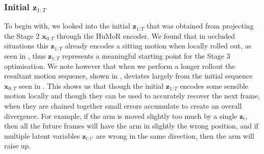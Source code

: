 \subsubsection{Initial $\mathbf{z}_{1:T}$}
To begin with, we looked into the initial $\mathbf{z}_{1:T}$ that was obtained from projecting the Stage 2 $\mathbf{x}_{0:T}$ through the HuMoR encoder. We found that in occluded situations this $\mathbf{z}_{1:T}$ already encodes a sitting motion when locally rolled out, as seen in , thus $\mathbf{z}_{1:T}$ represents a meaningful starting point for the Stage 3 optimisation. We note however that when we perform a longer rollout the resultant motion sequence, shown in , deviates largely from the initial sequence $\mathbf{x}_{0:T}$ seen in .
This shows us that though the initial $\mathbf{z}_{1:T}$ encodes some sensible motion locally and though they can be used to accurately recover the next frame, when they are chained together small errors accumulate to create an overall divergence. For example, if the arm is moved slightly too much by a single $\mathbf{z}_t$, then all the future frames will have the arm in slightly the wrong position, and if multiple latent variables $\mathbf{z}_{t:t'}$ are wrong in the same direction, then the arm will raise up. 


